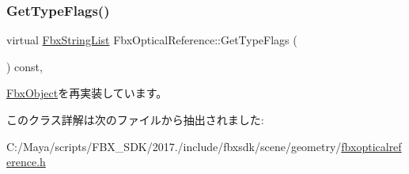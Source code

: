 \subsubsection{\texorpdfstring{Get\+Type\+Flags()}{GetTypeFlags()}}
{\footnotesize\ttfamily virtual \hyperlink{class_fbx_string_list}{Fbx\+String\+List} Fbx\+Optical\+Reference\+::\+Get\+Type\+Flags (\begin{DoxyParamCaption}{ }\end{DoxyParamCaption}) const\hspace{0.3cm}{\ttfamily [protected]}, {\ttfamily [virtual]}}



\hyperlink{class_fbx_object_a6d30a5d00400039a248977cf9f9255b2}{Fbx\+Object}を再実装しています。



このクラス詳解は次のファイルから抽出されました\+:\begin{DoxyCompactItemize}
\item 
C\+:/\+Maya/scripts/\+F\+B\+X\+\_\+\+S\+D\+K/2017./include/fbxsdk/scene/geometry/\hyperlink{fbxopticalreference_8h}{fbxopticalreference.\+h}\end{DoxyCompactItemize}
